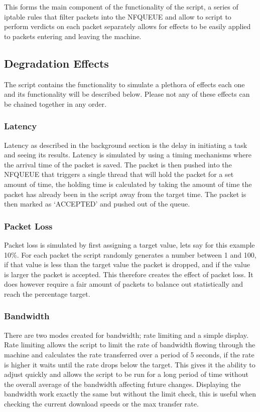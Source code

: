 This forms the main component of the functionality of the script, a series of iptable rules that filter packets into the NFQUEUE and allow to script to perform verdicts on each packet separately allows for effects to be easily applied to packets entering and leaving the machine.

\subsection{Degradation Effects}
The script contains the functionality to simulate a plethora of effects each one and its functionality will be described below. Please not any of these effects can be chained together in any order.

\subsubsection*{Latency}
Latency as described in the background section is the delay in initiating a task and seeing its results. Latency is simulated by using a timing mechanisms where the arrival time of the packet is saved. The packet is then pushed into the NFQUEUE that triggers a single thread that will hold the packet for a set amount of time, the holding time is calculated by taking the amount of time the packet has already been in the script away from the target time. The packet is then marked as `ACCEPTED' and pushed out of the queue.

\subsubsection*{Packet Loss}
Packet loss is simulated by first assigning a target value, lets say for this example 10\%. For each packet the script randomly generates a number between 1 and 100, if that value is less than the target value the packet is dropped, and if the value is larger the packet is accepted. This therefore creates the effect of packet loss. It does however require a fair amount of packets to balance out statistically and reach the percentage target.

\subsubsection*{Bandwidth}
There are two modes created for bandwidth; rate limiting and a simple display. Rate limiting allows the script to limit the rate of bandwidth flowing through the machine and calculates the rate transferred over a period of 5 seconds, if the rate is higher it waits until the rate drops below the target. This gives it the ability to adjust quickly and allows the script to be run for a long period of time without the overall average of the bandwidth affecting future changes. Displaying the bandwidth work exactly the same but without the limit check, this is useful when checking the current download speeds or the max transfer rate.

